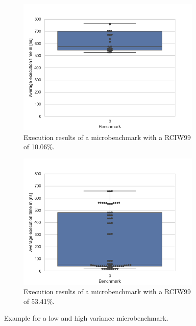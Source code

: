 \documentclass{seal_thesis}
\begin{document}
\begin{figure}[H]
	\centering
	\begin{subfigure}{.5\textwidth}
		\centering
		\includegraphics[width=\linewidth]{10percentvariance}
		\caption{Execution results of a microbenchmark with a RCIW99 of 10.06\%.}
		\label{fig:10percentvariance}
	\end{subfigure}%
	\begin{subfigure}{.5\textwidth}
		\centering
		\includegraphics[width=\linewidth]{53percentvariance}
		\caption{Execution results of a microbenchmark with a RCIW99 of 53.41\%.}
		\label{fig:53percentvariance}
	\end{subfigure}
	\caption{Example for a low and high variance microbenchmark.}
	\label{fig:variances}
\end{figure}
\end{document}
